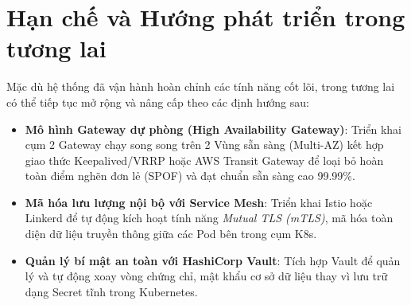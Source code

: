 \section{Hạn chế và Hướng phát triển trong tương lai}
Mặc dù hệ thống đã vận hành hoàn chỉnh các tính năng cốt lõi, trong tương lai có thể tiếp tục mở rộng và nâng cấp theo các định hướng sau:

\begin{itemize}
    \item \textbf{Mô hình Gateway dự phòng (High Availability Gateway)}: Triển khai cụm 2 Gateway chạy song song trên 2 Vùng sẵn sàng (Multi-AZ) kết hợp giao thức Keepalived/VRRP hoặc AWS Transit Gateway để loại bỏ hoàn toàn điểm nghẽn đơn lẻ (SPOF) và đạt chuẩn sẵn sàng cao 99.99\%.
    \item \textbf{Mã hóa lưu lượng nội bộ với Service Mesh}: Triển khai Istio hoặc Linkerd để tự động kích hoạt tính năng \textit{Mutual TLS (mTLS)}, mã hóa toàn diện dữ liệu truyền thông giữa các Pod bên trong cụm K8s.
    \item \textbf{Quản lý bí mật an toàn với HashiCorp Vault}: Tích hợp Vault để quản lý và tự động xoay vòng chứng chỉ, mật khẩu cơ sở dữ liệu thay vì lưu trữ dạng Secret tĩnh trong Kubernetes.
\end{itemize}
